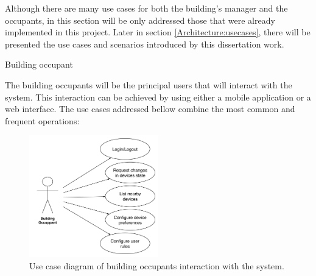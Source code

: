 Although there are many use cases for both the building's manager and the occupants, in this section will be only addressed those that were already implemented in this project. Later in section \ref{Architecture:usecases}, there will be presented the use cases and scenarios introduced by this dissertation work.
\newpage
\begin{Paragraph}{Building occupant}
	
The building occupants will be the principal users that will interact with the system. This interaction can be achieved by using either a mobile application or a web interface. The use cases addressed bellow combine the most common and frequent operations:


\begin{figure}[H]
	\centering
	\includegraphics[width=0.5\textwidth]{figures/usecase1.png}
	\caption{Use case diagram of building occupants interaction with the system.}
	\label{fig:user}
\end{figure}

\begin{itemize}


\end{itemize}
\end{Paragraph}
